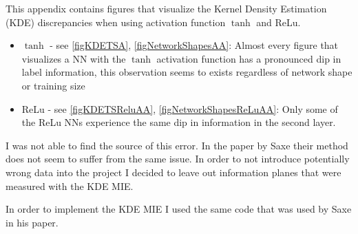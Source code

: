 \documentclass[dissertation.tex]{subfiles}
\begin{document}
This appendix contains figures that visualize the Kernel Density Estimation
(KDE) discrepancies when using activation function $\tanh$ and ReLu.
\begin{itemize}
  \item{
      $\tanh$ - see \autoref{figKDETSA}, \autoref{figNetworkShapesAA}: Almost every
      figure that visualizes a NN with the $\tanh$ activation function has a
      pronounced dip in label information, this observation seems to exists
      regardless of network shape or training size
    }
  \item{
      ReLu - see \autoref{figKDETSReluAA}, \autoref{figNetworkShapesReLuAA}: Only
      some of the ReLu NNs experience the same dip in information in the second
      layer.
    }
\end{itemize}
I was not able to find the source of this error. In the paper by Saxe their
method does not seem to suffer from the same issue. In order to not introduce
potentially wrong data into the project I decided to leave out information
planes that were measured with the KDE MIE.

In order to implement the KDE MIE I used the same code that was used by Saxe in
his paper.
\end{document}
